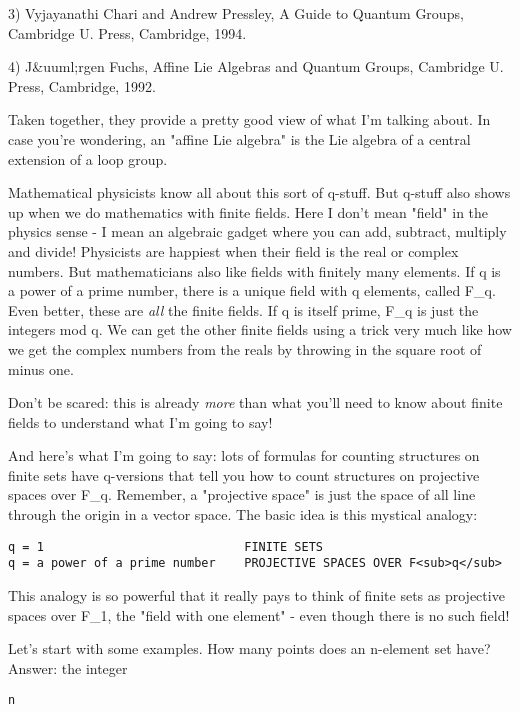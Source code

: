 3) Vyjayanathi Chari and Andrew Pressley, A Guide to Quantum Groups, 
Cambridge U. Press, Cambridge, 1994.

4) J&uuml;rgen Fuchs, Affine Lie Algebras and Quantum Groups, Cambridge
U. Press, Cambridge, 1992.  


Taken together, they provide a pretty good view of what I'm talking
about.  In case you're wondering, an "affine Lie algebra" is
the Lie algebra of a central extension of a loop group.


Mathematical physicists know all about this sort of q-stuff.  But
q-stuff also shows up when we do mathematics with finite fields.  Here I
don't mean "field" in the physics sense - I mean an algebraic
gadget where you can add, subtract, multiply and divide!  Physicists are
happiest when their field is the real or complex numbers.  But
mathematicians also like fields with finitely many elements.  If q is a
power of a prime number, there is a unique field with q elements, called
F_{q}.  Even better, these are \emph{all} the finite fields.
If q is itself prime, F_{q} is just the integers mod q.  We can
get the other finite fields using a trick very much like how we get the
complex numbers from the reals by throwing in the square root of minus
one.

Don't be scared: this is already \emph{more} than what you'll need to know
about finite fields to understand what I'm going to say!

And here's what I'm going to say: lots of formulas for counting
structures on finite sets have q-versions that tell you how to count
structures on projective spaces over F_{q}.  Remember, a "projective
space" is just the space of all line through the origin in a vector
space.  The basic idea is this mystical analogy:

\begin{verbatim}
q = 1                            FINITE SETS 
q = a power of a prime number    PROJECTIVE SPACES OVER F<sub>q</sub>
\end{verbatim}
    
This analogy is so powerful that it really pays to think of finite
sets as projective spaces over F_{1}, 
the "field with one element" - 
even though there is no such field!

Let's start with some examples.  How many points does an n-element set
have?  Answer: the integer

\begin{verbatim}
n
\end{verbatim}
    
